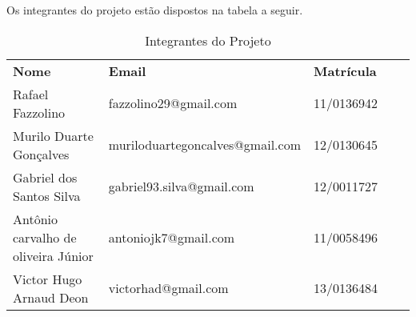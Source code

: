 
Os integrantes do projeto estão dispostos na tabela a seguir.

\begin{table}[H]
	\centering
	\label{my-label}
	\begin{tabular}{lllll}
		\cline{1-3}
		\multicolumn{1}{|l|}{\textbf{Nome}}    & \multicolumn{1}{l|}{\textbf{Email}}        & \multicolumn{1}{l|}{\textbf{Matrícula}} &  &  \\ \cline{1-3}
		\multicolumn{1}{|l|}{Rafael Fazzolino} & \multicolumn{1}{l|}{fazzolino29@gmail.com} & \multicolumn{1}{l|}{11/0136942}         &  &  \\ \cline{1-3}
		\multicolumn{1}{|l|}{Murilo Duarte Gonçalves}                 & \multicolumn{1}{l|}{muriloduartegoncalves@gmail.com}                      & \multicolumn{1}{l|}{12/0130645}                   &  &  \\ \cline{1-3}
		\multicolumn{1}{|l|}{Gabriel dos Santos Silva}    & \multicolumn{1}{l|}{gabriel93.silva@gmail.com}                      & \multicolumn{1}{l|}{12/0011727}                   &  &  \\ \cline{1-3}
		\multicolumn{1}{|l|}{Antônio carvalho de oliveira Júnior}    & \multicolumn{1}{l|}{antoniojk7@gmail.com}                      & \multicolumn{1}{l|}{11/0058496}                   &  &  \\ \cline{1-3}
		\multicolumn{1}{|l|}{Victor Hugo Arnaud Deon}    & \multicolumn{1}{l|}{victorhad@gmail.com}                      & \multicolumn{1}{l|}{13/0136484}                   &  &  \\ \cline{1-3}
	\end{tabular}
	\caption{Integrantes do Projeto}
\end{table}